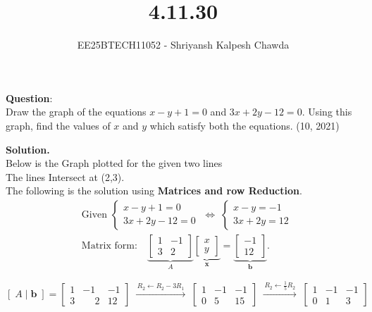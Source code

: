 \documentclass[journal]{IEEEtran}
\begin{document}
	
	
	\vspace{3cm}
	
	\title{4.11.30}
	\author{EE25BTECH11052 - Shriyansh Kalpesh Chawda}
	{\let\newpage\relax\maketitle}
	
	\renewcommand{\thefigure}{\theenumi}
	\renewcommand{\thetable}{\theenumi}
	\setlength{\intextsep}{10pt} 
	
	\renewcommand{\thetable}{\theenumi}
	
	\textbf{Question}:\\

Draw the graph of the equations $x - y + 1 = 0$ and $3x + 2y - 12 = 0$. Using this graph, find the values of $x$ and $y$ which satisfy both the equations. 
\hfill (10, 2021)

\textbf{Solution.}\\
Below is the Graph plotted for the given two lines \\
The lines Intersect at (2,3).\\
The following is the solution using \textbf{Matrices and row Reduction}.\\
\[
\begin{aligned}
	&\text{Given } 
	\begin{cases}
		x - y + 1 = 0\\
		3x + 2y - 12 = 0
	\end{cases}
	\;\Longleftrightarrow\;
	\begin{cases}
		x - y = -1\\
		3x + 2y = 12
	\end{cases} \\[4pt]
	&\text{Matrix form:}\quad
	\underbrace{\begin{bmatrix}1 & -1\\ 3 & 2\end{bmatrix}}_{A}
	\underbrace{\begin{bmatrix}x\\y\end{bmatrix}}_{\mathbf{x}}
	=
	\underbrace{\begin{bmatrix}-1\\12\end{bmatrix}}_{\mathbf{b}}.
\end{aligned}
\]

\[
\left[\; A \mid \mathbf{b} \;\right]
=
\left[
\begin{array}{cc|c}
	1 & -1 & -1\\
	3 & \phantom{-}2 & 12
\end{array}
\right]
\;\xrightarrow{\,R_2 \leftarrow R_2 - 3R_1\,}\;
\left[
\begin{array}{cc|c}
	1 & -1 & -1\\
	0 & 5 & 15
\end{array}
\right]
\;\xrightarrow{\,R_2 \leftarrow \tfrac{1}{5}R_2\,}\;
\left[
\begin{array}{cc|c}
	1 & -1 & -1\\
	0 & 1 & 3
\end{array}
\right]
\]
\end{document}
